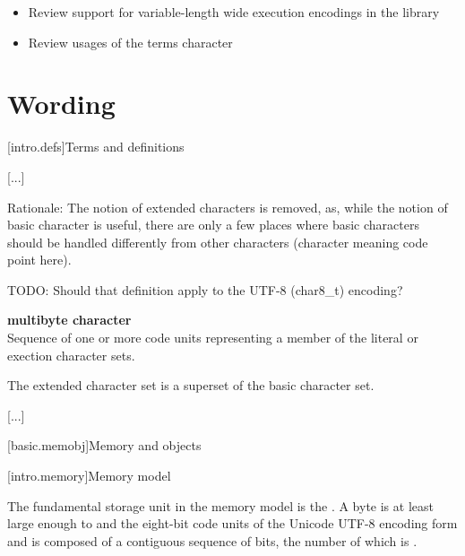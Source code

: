 \documentclass{wg21}
\begin{document}
\begin{itemize}
\item Review support for variable-length wide execution encodings in the library
\item Review usages of the terms character
\end{itemize}

\section{Wording}



[intro.defs]{Terms and definitions}

[...]

\begin{quoteblock}
Rationale: The notion of extended characters is removed, as, while the notion of basic character is useful,
there are only a few places where basic characters should be handled differently from other characters (character meaning code point here).

TODO: Should that definition apply to the UTF-8 (char8_t) encoding?
\end{quoteblock}


\textbf{multibyte character}\\
{Sequence of one or more code units representing a member of the literal or exection character sets.}

\begin{removedblock}
\begin{note}
    The extended character set is a superset of the basic character
    set.
\end{note}
\end{removedblock}


[...]

[basic.memobj]{Memory and objects}

[intro.memory]{Memory model}

\pnum
{}%
The fundamental storage unit in the \Cpp{} memory model is the
.
A byte is at least large enough to 
and the eight-bit code units of the Unicode
UTF-8 encoding form
and is composed of a contiguous sequence of
bits, the number of which is .
\end{document}
